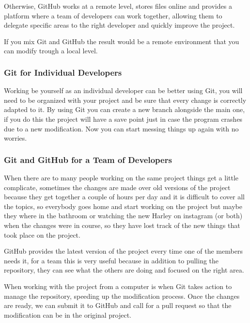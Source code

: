 \documentclass{article}
\begin{document}
	Otherwise, GitHub works at a remote level, stores files online and provides a platform where a team of developers can work together, allowing them to delegate specific areas to the right developer and quickly improve the project.\par

    If you mix Git and GitHub the result would be a remote environment that you can modify trough a local level.
    
    \subsubsection{Git for Individual Developers}
    
    Working be yourself as an individual developer can be better using Git, you will need to be organized with your project and be sure that every change is correctly adapted to it. By using Git you can create a new branch alongside the main one, if you do this the project will have a save point just in case the program crashes due to a new modification. Now you can start messing things up again with no worries.
    
    \subsubsection{Git and GitHub for a Team of Developers}
    
    When there are to many people working on the same project things get a little complicate, sometimes the changes are made over old versions of the project because they get together a couple of hours per day and it is difficult to cover all the topics, so everybody goes home and start working on the project but maybe they where in the bathroom or watching the new Harley on instagram (or both) when the changes were in course, so they have lost track of the new things that took place on the project.\par
    
    GitHub provides the latest version of the project every time one of the members needs it, for a team this is very useful because in addition to pulling the repository, they can see what the others are doing and focused on the right area.\par
    
    When working with the project from a computer is when Git takes action to manage the repository, speeding up the modification process. Once the changes are ready, we can submit it to GitHub and call for a pull request so that the modification can be in the original project.
    
\end{document}
